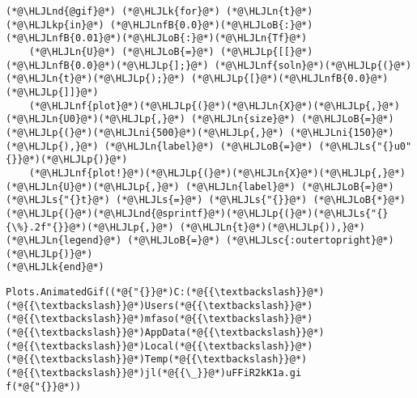 \documentclass[12pt,a4paper]{article}
\newcommand{\HLJLk}[1]{\textcolor[RGB]{148,91,176}{\textbf{#1}}}
\newcommand{\HLJLkp}[1]{\textcolor[RGB]{148,91,176}{\textbf{#1}}}
\newcommand{\HLJLn}[1]{#1}
\newcommand{\HLJLnd}[1]{\textcolor[RGB]{214,102,97}{#1}}
\newcommand{\HLJLnf}[1]{\textcolor[RGB]{66,102,213}{#1}}
\newcommand{\HLJLs}[1]{\textcolor[RGB]{201,61,57}{#1}}
\newcommand{\HLJLsc}[1]{\textcolor[RGB]{201,61,57}{#1}}
\newcommand{\HLJLnfB}[1]{\textcolor[RGB]{59,151,46}{#1}}
\newcommand{\HLJLni}[1]{\textcolor[RGB]{59,151,46}{#1}}
\newcommand{\HLJLoB}[1]{\textcolor[RGB]{102,102,102}{\textbf{#1}}}
\newcommand{\HLJLp}[1]{#1}
\begin{document}
\begin{lstlisting}
(*@\HLJLnd{@gif}@*) (*@\HLJLk{for}@*) (*@\HLJLn{t}@*) (*@\HLJLkp{in}@*) (*@\HLJLnfB{0.0}@*)(*@\HLJLoB{:}@*)(*@\HLJLnfB{0.01}@*)(*@\HLJLoB{:}@*)(*@\HLJLn{Tf}@*) 
    (*@\HLJLn{U}@*) (*@\HLJLoB{=}@*) (*@\HLJLp{[[}@*)(*@\HLJLnfB{0.0}@*)(*@\HLJLp{];}@*) (*@\HLJLnf{soln}@*)(*@\HLJLp{(}@*)(*@\HLJLn{t}@*)(*@\HLJLp{);}@*) (*@\HLJLp{[}@*)(*@\HLJLnfB{0.0}@*)(*@\HLJLp{]]}@*)
    (*@\HLJLnf{plot}@*)(*@\HLJLp{(}@*)(*@\HLJLn{X}@*)(*@\HLJLp{,}@*) (*@\HLJLn{U0}@*)(*@\HLJLp{,}@*) (*@\HLJLn{size}@*) (*@\HLJLoB{=}@*) (*@\HLJLp{(}@*)(*@\HLJLni{500}@*)(*@\HLJLp{,}@*) (*@\HLJLni{150}@*)(*@\HLJLp{),}@*) (*@\HLJLn{label}@*) (*@\HLJLoB{=}@*) (*@\HLJLs{"{}u0"{}}@*)(*@\HLJLp{)}@*)
    (*@\HLJLnf{plot!}@*)(*@\HLJLp{(}@*)(*@\HLJLn{X}@*)(*@\HLJLp{,}@*) (*@\HLJLn{U}@*)(*@\HLJLp{,}@*) (*@\HLJLn{label}@*) (*@\HLJLoB{=}@*) (*@\HLJLs{"{}t}@*) (*@\HLJLs{=}@*) (*@\HLJLs{"{}}@*) (*@\HLJLoB{*}@*) (*@\HLJLp{(}@*)(*@\HLJLnd{@sprintf}@*)(*@\HLJLp{(}@*)(*@\HLJLs{"{}{\%}.2f"{}}@*)(*@\HLJLp{,}@*) (*@\HLJLn{t}@*)(*@\HLJLp{)),}@*) (*@\HLJLn{legend}@*) (*@\HLJLoB{=}@*) (*@\HLJLsc{:outertopright}@*)(*@\HLJLp{)}@*)
(*@\HLJLk{end}@*)
\end{lstlisting}

\begin{lstlisting}
Plots.AnimatedGif((*@{"{}}@*)C:(*@{{\textbackslash}}@*)(*@{{\textbackslash}}@*)Users(*@{{\textbackslash}}@*)(*@{{\textbackslash}}@*)mfaso(*@{{\textbackslash}}@*)(*@{{\textbackslash}}@*)AppData(*@{{\textbackslash}}@*)(*@{{\textbackslash}}@*)Local(*@{{\textbackslash}}@*)(*@{{\textbackslash}}@*)Temp(*@{{\textbackslash}}@*)(*@{{\textbackslash}}@*)jl(*@{{\_}}@*)uFFiR2kK1a.gi
f(*@{"{}}@*))
\end{lstlisting}
\end{document}
